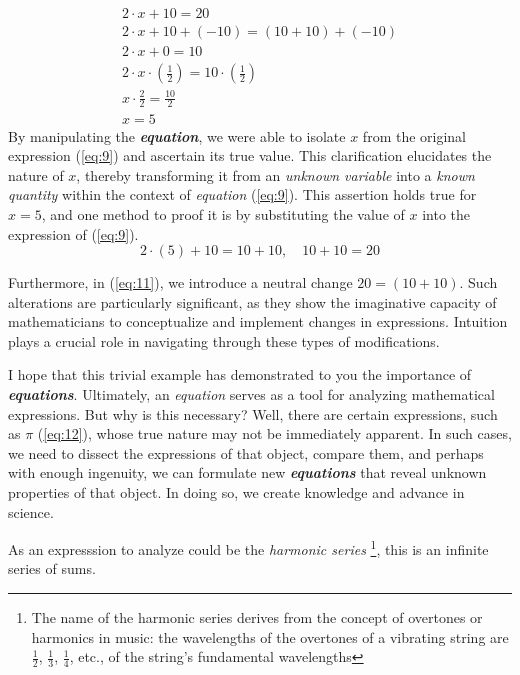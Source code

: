 \begin{equation} \label{eq:11}
  \begin{gathered}
    2 \cdot x + 10 = 20\\
    2 \cdot x + 10 + (-10) = (10 + 10) + (-10)\\
    2 \cdot x + 0 = 10\\
    2 \cdot x \cdot (\frac{1}{2}) = 10 \cdot (\frac{1}{2})\\
    x \cdot \frac{2}{2} = \frac{10}{2}\\
    x = 5
  \end{gathered}
\end{equation}
By manipulating the \textbf{\textit{equation}}, we were able to isolate $x$ from the original expression (\ref{eq:9}) and ascertain its true value. This clarification elucidates the nature of $x$, thereby transforming it from an \textit{unknown variable} into a \textit{known quantity} within the context of \textit{equation} (\ref{eq:9}).
This assertion holds true for $x = 5$, and one method to proof it is by substituting the value of $x$ into the expression of (\ref{eq:9}).
\[
  2 \cdot (5) + 10 = 10 + 10,\quad 10 + 10 = 20
\]

Furthermore, in (\ref{eq:11}), we introduce a neutral change $20 = (10 + 10)$. Such alterations are particularly significant, as they show the imaginative capacity of mathematicians to conceptualize and implement changes in expressions. Intuition plays a crucial role in navigating through these types of modifications.

I hope that this trivial example has demonstrated to you the importance of \textbf{\textit{equations}}. Ultimately, an \textit{equation} serves as a tool for analyzing mathematical expressions. But why is this necessary? Well, there are certain expressions, such as \textit{$\pi$} (\ref{eq:12}), whose true nature may not be immediately apparent. In such cases, we need to dissect the expressions of that object, compare them, and perhaps with enough ingenuity, we can formulate new \textbf{\textit{equations}} that reveal unknown properties of that object. In doing so, we create knowledge and advance in science.

As an expresssion to analyze could be the \textit{harmonic series}
\footnote{The name of the harmonic series derives from the concept of overtones or harmonics in music: the wavelengths of the overtones of a vibrating string are 
$\frac{1}{2}$, 
$\frac{1}{3}$, 
$\frac{1}{4}$, etc., of the string's fundamental wavelengths}, this is an infinite series of sums.

